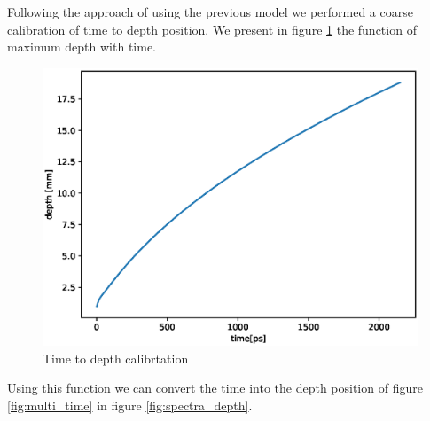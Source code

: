 \documentclass{osa-article}
\begin{document}
Following the approach of \cite{depthLight} using the previous model we performed a coarse calibration of time to depth position.
We present in figure \ref{fig:time_depth} the function of maximum depth with time.
\begin{figure}
    \centering
    \includegraphics[scale = 0.4]{figure/time_depth_conv.eps}
    \caption{Time to depth calibrtation}
    \label{fig:time_depth}
\end{figure}
Using this function we can convert the time into the depth position of figure \ref{fig:multi_time} in figure \ref{fig:spectra_depth}.
\end{document}
